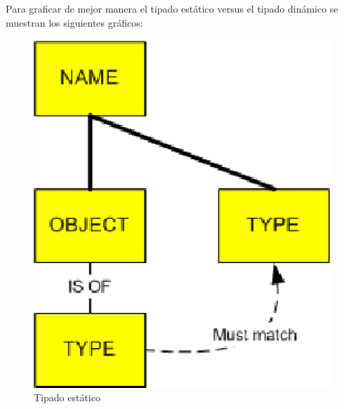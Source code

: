 \documentclass[12pt,legalpaper]{report}
\begin{document}
Para graficar de mejor manera el tipado estático versus el tipado dinámico se muestran los siguientes gráficos:

\begin{figure}[h]
	\centering
	\includegraphics[scale=0.5]{images/JavaPython/staticTyping.eps}
	\caption{Tipado estático}
\end{figure}
\end{document}
